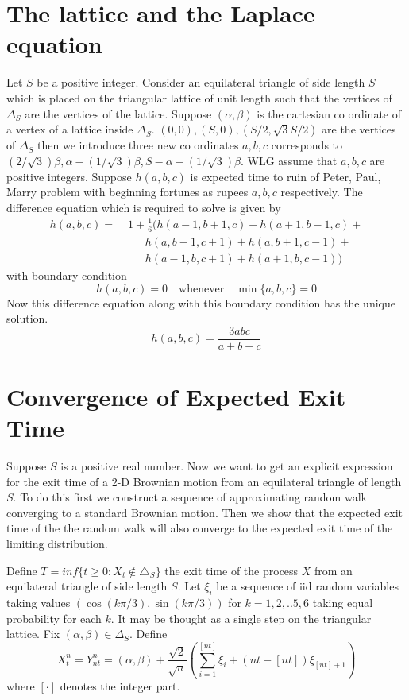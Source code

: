 \documentclass[a0,portrait]{a0poster}
\begin{document}
\begin{mdframed}[style=MyFrame]
\begin{multicols}{2}
\section{The lattice and the Laplace equation}\label{section2}
Let $S$ be a positive integer. Consider an equilateral triangle of side length $S$ which is placed on the triangular lattice of unit length such that the vertices of $\Delta_S$ are the vertices of the lattice. Suppose $(\alpha,\beta)$ is the cartesian co ordinate of a vertex of a lattice inside $\Delta_S$. $(0,0),(S,0),(S/2,\sqrt{3}S/2)$ are the vertices of $\Delta_S$ then we introduce three new co ordinates $a,b,c$ corresponds to $(2/\sqrt{3})\beta, \alpha - (1/\sqrt{3}) \beta, S - \alpha - (1/\sqrt{3}) \beta$. WLG assume that $a,b,c$ are positive integers. Suppose $h(a,b,c)$ is expected time to ruin of Peter, Paul, Marry problem with beginning fortunes as rupees $a,b,c$ respectively. The difference equation which is required to solve is given by\cite[p. 46]{MR2023644}
\begin{align*}
h(a, b, c) =\; &1 + \frac{1}{6} \big( 
    h(a - 1, b + 1, c) + 
    h(a + 1, b - 1, c) + \\
    &\quad\;\; h(a, b - 1, c + 1) + 
    h(a, b + 1, c - 1) + \\
    &\quad\;\; h(a - 1, b, c + 1) + 
    h(a + 1, b, c - 1)
\big)
\end{align*}
with boundary condition 
\[
h(a, b, c) = 0 \quad \text{whenever} \quad \min\{a, b, c\} = 0
\]
Now this difference equation along with this boundary condition has the unique solution.
\[
h(a, b, c) = \frac{3abc}{a + b + c}
\]


\section{Convergence of Expected Exit Time}\label{section4}Suppose \(S\) is a positive real number. Now we want to get an explicit expression for the exit time of a 2-D Brownian motion from an equilateral triangle of length \(S\). To do this first we construct a sequence of approximating random walk converging to a standard Brownian motion. Then we show that the expected exit time of the the random walk will also converge to the expected exit time of the limiting distribution.

\noindent Define \(T=inf\{t \geq 0 : X_t \notin \triangle_S\}\) the exit time of the process \(X\) from an equilateral triangle of side length \(S\). Let \(\xi_i\) be a sequence of iid random variables taking values $(\cos(k\pi/3), \sin(k\pi/3))$ for \(k=1,2,..5,6\) taking equal probability for each \(k\). It may be thought as a single step on the triangular lattice. Fix $(\alpha,\beta) \in \Delta_S$. Define \cite[p. 47]{MR2023644}
\begin{equation}
X^n_t=Y^n_{nt} = (\alpha, \beta) + \frac{\sqrt{2}}{\sqrt{n}} \left( \sum_{i=1}^{[nt]} \xi_i + (nt - [ nt])\xi_{[nt] + 1} \right)
\end{equation}
where \( [ \cdot ] \) denotes the integer part.


\end{multicols}
\end{mdframed}
\end{document}
